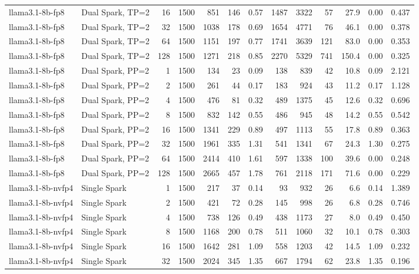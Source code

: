 \begin{tabular}{l l r r r r r r r r r r r}
llama3.1-8b-fp8 & Dual Spark, TP=2 & 16 & 1500 & 851 & 146 & 0.57 & 1487 & 3322 & 57 & 27.9 & 0.00 & 0.437 \\
llama3.1-8b-fp8 & Dual Spark, TP=2 & 32 & 1500 & 1038 & 178 & 0.69 & 1654 & 4771 & 76 & 46.1 & 0.00 & 0.378 \\
llama3.1-8b-fp8 & Dual Spark, TP=2 & 64 & 1500 & 1151 & 197 & 0.77 & 1741 & 3639 & 121 & 83.0 & 0.00 & 0.353 \\
llama3.1-8b-fp8 & Dual Spark, TP=2 & 128 & 1500 & 1271 & 218 & 0.85 & 2270 & 5329 & 741 & 150.4 & 0.00 & 0.325 \\
\addlinespace
llama3.1-8b-fp8 & Dual Spark, PP=2 & 1 & 1500 & 134 & 23 & 0.09 & 138 & 839 & 42 & 10.8 & 0.09 & 2.121 \\
llama3.1-8b-fp8 & Dual Spark, PP=2 & 2 & 1500 & 261 & 44 & 0.17 & 183 & 924 & 43 & 11.2 & 0.17 & 1.128 \\
llama3.1-8b-fp8 & Dual Spark, PP=2 & 4 & 1500 & 476 & 81 & 0.32 & 489 & 1375 & 45 & 12.6 & 0.32 & 0.696 \\
llama3.1-8b-fp8 & Dual Spark, PP=2 & 8 & 1500 & 832 & 142 & 0.55 & 486 & 945 & 48 & 14.2 & 0.55 & 0.542 \\
llama3.1-8b-fp8 & Dual Spark, PP=2 & 16 & 1500 & 1341 & 229 & 0.89 & 497 & 1113 & 55 & 17.8 & 0.89 & 0.363 \\
llama3.1-8b-fp8 & Dual Spark, PP=2 & 32 & 1500 & 1961 & 335 & 1.31 & 541 & 1341 & 67 & 24.3 & 1.30 & 0.275 \\
llama3.1-8b-fp8 & Dual Spark, PP=2 & 64 & 1500 & 2414 & 410 & 1.61 & 597 & 1338 & 100 & 39.6 & 0.00 & 0.248 \\
llama3.1-8b-fp8 & Dual Spark, PP=2 & 128 & 1500 & 2665 & 457 & 1.78 & 761 & 2118 & 171 & 71.6 & 0.00 & 0.229 \\
\addlinespace
llama3.1-8b-nvfp4 & Single Spark & 1 & 1500 & 217 & 37 & 0.14 & 93 & 932 & 26 & 6.6 & 0.14 & 1.389 \\
llama3.1-8b-nvfp4 & Single Spark & 2 & 1500 & 421 & 72 & 0.28 & 145 & 998 & 26 & 6.8 & 0.28 & 0.746 \\
llama3.1-8b-nvfp4 & Single Spark & 4 & 1500 & 738 & 126 & 0.49 & 438 & 1173 & 27 & 8.0 & 0.49 & 0.450 \\
llama3.1-8b-nvfp4 & Single Spark & 8 & 1500 & 1168 & 200 & 0.78 & 511 & 1060 & 32 & 10.1 & 0.78 & 0.303 \\
llama3.1-8b-nvfp4 & Single Spark & 16 & 1500 & 1642 & 281 & 1.09 & 558 & 1203 & 42 & 14.5 & 1.09 & 0.232 \\
llama3.1-8b-nvfp4 & Single Spark & 32 & 1500 & 2024 & 345 & 1.35 & 667 & 1794 & 62 & 23.8 & 1.35 & 0.196 \\

\end{tabular}
